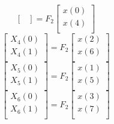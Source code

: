 \documentclass[journal,12pt,twocolumn]{IEEEtran}
\renewcommand\thesection{\arabic{section}}
\begin{document}
\begin{enumerate}[label=\thesection.\arabic*.,ref=\thesection.\theenumi]
\begin{equation}
\begin{bmatrix}
\end{bmatrix}
= F_{2}
\begin{bmatrix}
x(0) \\ 
x(4) \\ 
\end{bmatrix}
\end{equation}
\begin{equation}
\begin{bmatrix}
X_{4}(0) \\ 
X_{4}(1)\\ 
\end{bmatrix}
= F_{2}
\begin{bmatrix}
x(2) \\ 
x(6) \\ 
\end{bmatrix}
\end{equation}
\begin{equation}
\begin{bmatrix}
X_{5}(0) \\ 
X_{5}(1)\\ 
\end{bmatrix}
= F_{2}
\begin{bmatrix}
x(1) \\ 
x(5) \\ 
\end{bmatrix}
\end{equation}
\begin{equation}
\begin{bmatrix}
X_{6}(0) \\ 
X_{6}(1)\\ 
\end{bmatrix}
= F_{2}
\begin{bmatrix}
x(3) \\ 
x(7) \\ 
\end{bmatrix}
\end{equation}


\end{enumerate}
\end{document}
